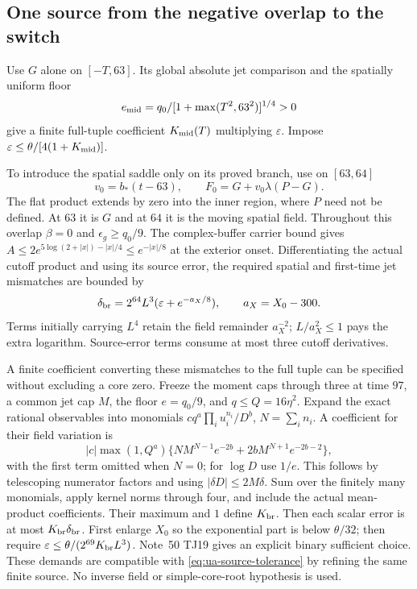 \subsection{One source from the negative overlap to the switch}
Use $G$ alone on $[-T,63]$. Its global absolute jet comparison and
the spatially uniform floor
\begin{equation}
 e_{\rm mid}=q_0/[1+\max(T^2,63^2)]^{1/4}>0
 \label{eq:tc-middle-floor}
\end{equation}
give a finite full-tuple coefficient $K_{\rm mid}(T)$ multiplying
$\varepsilon$. Impose
$\varepsilon\le\theta/[4(1+K_{\rm mid})]$.

To introduce the spatial saddle only on its proved branch, use on
$[63,64]$
\begin{equation}
 v_0=b_*(t-63),\qquad F_0=G+v_0\lambda(P-G).
 \label{eq:tc-preswitch-join}
\end{equation}
The flat product extends by zero into the inner region, where $P$ need
not be defined. At $63$ it is $G$ and at $64$ it is the moving spatial
field. Throughout this overlap $\beta=0$ and $\epsilon_g\ge q_0/9$.
The complex-buffer carrier bound gives
$A\le2e^{5\log(2+|x|)-|x|/4}\le e^{-|x|/8}$ at the exterior onset.
Differentiating the actual cutoff product and using its source error,
the required spatial and first-time jet mismatches are bounded by
\begin{equation}
 \delta_{
 \rm br}=2^{64}L^3(\varepsilon+e^{-a_X/8}),\qquad a_X=X_0-300.
 \label{eq:tc-bridge-jets}
\end{equation}
Terms initially carrying $L^4$ retain the field remainder $a_X^{-2}$;
$L/a_X^2\le1$ pays the extra logarithm. Source-error terms consume at
most three cutoff derivatives.

A finite coefficient converting these mismatches to the full tuple can
be specified without excluding a core zero. Freeze the moment caps
through three at time $97$, a common jet cap $M$, the floor $e=q_0/9$,
and $q\le Q=16\eta^2$. Expand the exact rational observables into
monomials $c q^a\prod_i u_i^{n_i}/D^b$, $N=\sum_i n_i$.
A coefficient for their field variation is
\begin{equation}
 |c|\max(1,Q^a)
 \{NM^{N-1}e^{-2b}+2bM^{N+1}e^{-2b-2}\},
 \label{eq:tc-rational-coefficient}
\end{equation}
with the first term omitted when $N=0$; for $\log D$ use $1/e$.
This follows by telescoping numerator factors and using
$|\delta D|\le2M\delta$. Sum over the finitely many monomials,
apply kernel norms through four, and include the actual mean-product
coefficients. Their maximum and $1$ define $K_{\rm br}$.
Then each scalar error is at most $K_{\rm br}\delta_{\rm br}$.
First enlarge $X_0$ so the exponential part is below $\theta/32$;
then require $\varepsilon\le\theta/(2^{69}K_{\rm br}L^3)$.
Note~50 TJ19 gives an explicit binary sufficient choice. These demands
are compatible with \eqref{eq:ua-source-tolerance} by refining the same
finite source. No inverse field or simple-core-root hypothesis is used.


